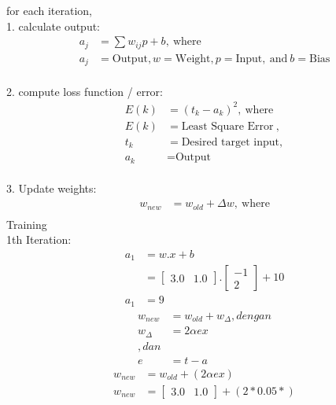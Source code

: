 \documentclass{article}
\begin{document}
	for each iteration, 
	\\ 1. calculate output:
	\begin{align*}
		a_j & = \sum w_{ij} p + b,~\text{where}\\
		a_j & = \text{Output}, w = \text{Weight}, p = \text{Input},~\text{and}~b = \text{Bias}
	\end{align*}
	\\ 2. compute loss function / error:
	\begin{align*}
		E(k) & = (t_k - a_k)^2,~\text{where} \\
		E(k) & = \text{Least Square Error}~, \\
		t_k & = \text{Desired target input}, \\
		a_k & = \text{Output}
	\end{align*}
	\\ 3. Update weights:
	\begin{align*}
		w_{new} & = w_{old} + \Delta w, ~\text{where} \\
	\end{align*}
	Training \\
	1th Iteration: \\
	\begin{equation}
	\begin{split}
		a_1 & = w.x+b \\
		& = \begin{bmatrix}
			3.0 & 1.0
		\end{bmatrix}. \begin{bmatrix}
		-1 \\ 2
	\end{bmatrix} + 10 \\
	a_1 & = 9
	\end{split}
	\end{equation}
	\begin{equation}
	\begin{split}
		w_{new} & = w_{old} + w_\Delta, dengan \\
		w_{\Delta} & = 2 \alpha e x \\, dan \\
		e & = t - a
	\end{split}
	\end{equation}
	\begin{equation}
	\begin{split}
		w_{new} & = w_{old} + (2 \alpha e x) \\
		w_{new} & = \begin{bmatrix}
			3.0 & 1.0
		\end{bmatrix} + (2 * 0.05 * )
	\end{split}
	\end{equation}
\end{document}
